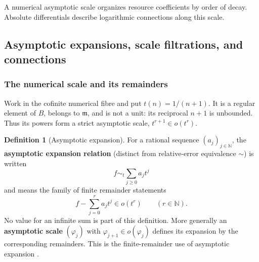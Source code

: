 \documentclass[11pt,a4paper]{article}
\numberwithin{algorithm}{section}
\numberwithin{equation}{section}
\theoremstyle{definition}
\newtheorem{definition}[definition]{Definition}
\theoremstyle{remark}
\theoremstyle{plain}
\newcommand{\N}{\mathbb N}
\theoremstyle{definition}
\theoremstyle{plain}
\begin{document}
A numerical asymptotic scale organizes resource coefficients by order of decay. Absolute differentials describe logarithmic connections along this scale.

\subsection{Asymptotic expansions, scale filtrations, and connections}
\label{sec:scales}
\subsubsection{The numerical scale and its remainders}
Work in the cofinite numerical fibre and put $t(n)=1/(n+1)$.
It is a regular element of $B$, belongs to $\mathfrak m$,
and is not a unit: its reciprocal $n+1$ is unbounded.
Thus its powers form a strict asymptotic scale,
$t^{r+1}\in o(t^r)$.

\begin{definition}[Asymptotic expansion]\label{def:expansion}
For a rational sequence $(a_j)_{j\in\N}$, the \textbf{asymptotic expansion relation} (distinct from relative-error equivalence $\sim$) is written
\[
 f\mathrel{\sim_t}\sum_{j\ge0}a_jt^j
\]
and means the family of finite remainder statements
\[
 f-\sum_{j=0}^r a_jt^j\in o(t^r)\qquad(r\in\N).
\]
No value for an infinite sum is part of this definition.
More generally an \textbf{asymptotic scale} $(\varphi_j)$ with
$\varphi_{j+1}\in o(\varphi_j)$ defines its expansion by
the corresponding remainders. This is the finite-remainder
use of asymptotic expansion \citep{DLMF}.
\end{definition}
\end{document}
